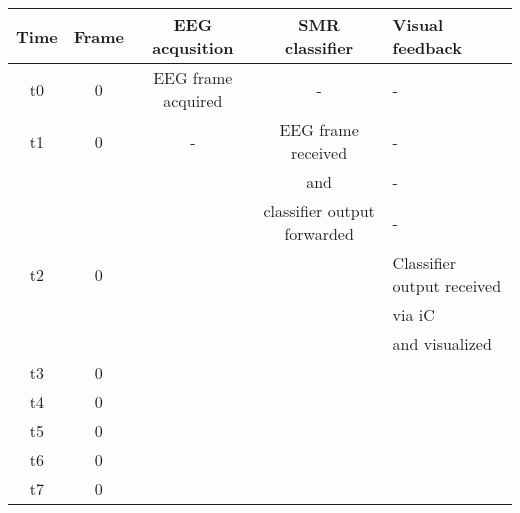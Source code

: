 \begin{tabular}{|c|c|c|c|l|}
  \hline
  Time 	&	Frame 	& EEG acqusition 		& SMR classifier 		& Visual feedback\\
  \hline
  t0	&	0 		& EEG frame acquired	& -						& -				\\
  \hline
  t1	&	0 		& - 			 		& EEG frame received 	& -				\\
  		&	 		&  				 		& and & -				\\
  		&	 		&  				 		& classifier output forwarded& -				\\
  t2	&	0 		&  				 		& 						& Classifier output received \\
  		&	 		&  				 		& 						& via iC\\
  		&	 		&  				 		& 						& and visualized	\\
  t3	&	0 		&  				 		& 						& 				\\
  t4	&	0 		&  				 		& 						& 				\\
  t5	&	0 		&  				 		& 						& 				\\
  t6	&	0 		&  				 		& 						& 				\\
  t7	&	0 		&  				 		& 						& 				\\
  \hline
\end{tabular}
